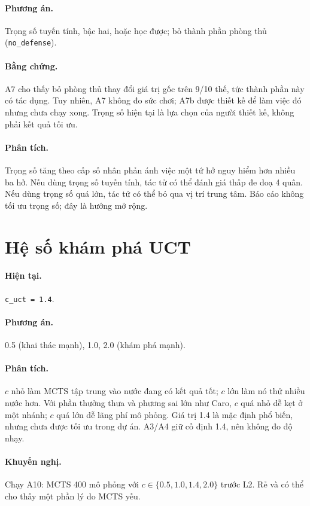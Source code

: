 \paragraph{Phương án.} Trọng số tuyến tính, bậc hai, hoặc học được; bỏ thành phần phòng thủ
(\texttt{no\_defense}).
\paragraph{Bằng chứng.} A7 cho thấy bỏ phòng thủ thay đổi giá trị gốc trên 9/10 thế, tức thành
phần này có tác dụng. Tuy nhiên, A7 không đo sức chơi; A7b được thiết kế để làm việc đó nhưng
chưa chạy xong. Trọng số hiện tại là lựa chọn của người thiết kế, không phải kết quả tối ưu.
\paragraph{Phân tích.} Trọng số tăng theo cấp số nhân phản ánh việc một tứ hở nguy hiểm hơn
nhiều ba hở. Nếu dùng trọng số tuyến tính, tác tử có thể đánh giá thấp đe doạ 4 quân. Nếu dùng
trọng số quá lớn, tác tử có thể bỏ qua vị trí trung tâm. Báo cáo không tối ưu trọng số; đây là
hướng mở rộng.

\section{Hệ số khám phá UCT}
\paragraph{Hiện tại.} \texttt{c\_uct = 1.4}.
\paragraph{Phương án.} 0.5 (khai thác mạnh), 1.0, 2.0 (khám phá mạnh).
\paragraph{Phân tích.} $c$ nhỏ làm MCTS tập trung vào nước đang có kết quả tốt; $c$ lớn làm nó
thử nhiều nước hơn. Với phần thưởng thưa và phương sai lớn như Caro, $c$ quá nhỏ dễ kẹt ở một
nhánh; $c$ quá lớn dễ lãng phí mô phỏng. Giá trị 1.4 là mặc định phổ biến, nhưng chưa được
tối ưu trong dự án. A3/A4 giữ cố định 1.4, nên không đo độ nhạy.
\paragraph{Khuyến nghị.} Chạy A10: MCTS 400 mô phỏng với $c \in \{0.5, 1.0, 1.4, 2.0\}$ trước
L2. Rẻ và có thể cho thấy một phần lý do MCTS yếu.

